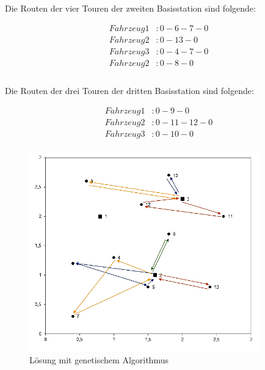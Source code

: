 \documentclass[a4paper,12pt,parskip,bibtotoc,liststotoc]{article}
\begin{document}
Die Routen der vier Touren der zweiten Basisstation sind folgende: 

\begin{equation} \label{eq:test}
    \begin{aligned} 
         Fahrzeug 1&: 0 - 6 - 7 - 0 \\
        Fahrzeug 2&: 0 - 13 - 0\\
        Fahrzeug 3&: 0 - 4 - 7 - 0\\
        Fahrzeug 2&: 0 - 8 - 0\\
    \end{aligned}
\end{equation}\\

Die Routen der drei Touren der dritten Basisstation sind folgende: 

\begin{equation} \label{eq:test}
    \begin{aligned} 
         Fahrzeug 1&: 0 - 9 - 0 \\
        Fahrzeug 2&: 0 - 11 - 12 - 0\\
         Fahrzeug 3&: 0 - 10 - 0\\
    \end{aligned}
\end{equation}



\begin{figure}[h!]
  \begin{center}
      \includegraphics[width=100mm]{vrp33a.png}
    \caption{Lösung mit genetischem Algorithmus}  \label{Typen}
  \end{center}
\end{figure}
\end{document}
